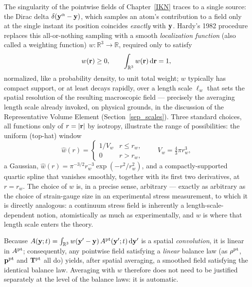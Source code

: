 The singularity of the pointwise fields of Chapter~\ref{IKN} traces to a single source: the Dirac delta $\delta(\mathbf{y}^\alpha-\mathbf{y})$, which samples an atom's contribution to a field only at the single instant its position coincides \textit{exactly} with $\mathbf{y}$. Hardy's 1982 procedure \cite{TadmorMiller} replaces this all-or-nothing sampling with a smooth \textit{localization function} (also called a weighting function) $w:\mathbb R^3\to\mathbb R$, required only to satisfy
\begin{equation}\label{wnorm}
	w(\mathbf{r})\geq0, \qquad \int_{\mathbb R^3} w(\mathbf{r})\,\mathrm{d}\mathbf{r} = 1,
\end{equation}
normalized, like a probability density, to unit total weight; $w$ typically has compact support, or at least decays rapidly, over a length scale $\ell_w$ that sets the spatial resolution of the resulting macroscopic field --- precisely the averaging length scale already invoked, on physical grounds, in the discussion of the Representative Volume Element (Section~\ref{sep_scales}). Three standard choices, all functions only of $r=|\mathbf{r}|$ by isotropy, illustrate the range of possibilities: the uniform (top-hat) window
\begin{equation}
	\widehat w(r) = \begin{cases} 1/V_w & r\leq r_w,\\ 0 & r>r_w,\end{cases} \qquad V_w = \tfrac43\pi r_w^3,
\end{equation}
a Gaussian, $\widehat w(r)=\pi^{-3/2}r_w^{-3}\exp(-r^2/r_w^2)$, and a compactly-supported quartic spline that vanishes smoothly, together with its first two derivatives, at $r=r_w$. The choice of $w$ is, in a precise sense, arbitrary --- exactly as arbitrary as the choice of strain-gauge size in an experimental stress measurement, to which it is directly analogous: a continuum stress field is inherently a length-scale-dependent notion, atomistically as much as experimentally, and $w$ is where that length scale enters the theory.

\begin{remark}
	Because $A(\mathbf{y};t)=\int_{\mathbb R^3}w(\mathbf{y}'-\mathbf{y})\,A^{\rm pt}(\mathbf{y}';t)\,\mathrm{d}\mathbf{y}'$ is a spatial \textit{convolution}, it is linear in $A^{\rm pt}$; consequently, any pointwise field satisfying a \textit{linear} balance law (as $\rho^{\rm pt}$, $\mathbf{p}^{\rm pt}$ and $\mathbf{T}^{\rm pt}$ all do) yields, after spatial averaging, a smoothed field satisfying the identical balance law. Averaging with $w$ therefore does not need to be justified separately at the level of the balance laws: it is automatic.
\end{remark}

